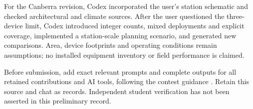 \documentclass[12pt]{article}
\begin{document}
For the Canberra revision, Codex incorporated the user's station schematic and checked architectural and climate sources. After the user questioned the three-device limit, Codex introduced integer counts, mixed deployments and explicit coverage, implemented a station-scale planning scenario, and generated new comparisons. Area, device footprints and operating conditions remain assumptions; no installed equipment inventory or field performance is claimed.

Before submission, add exact relevant prompts and complete outputs for all
retained contributions and AI tools, following the contest guidance \cite{aipolicy}.
Retain this source and chat as records. Independent student verification has
not been asserted in this preliminary record.
\end{document}

